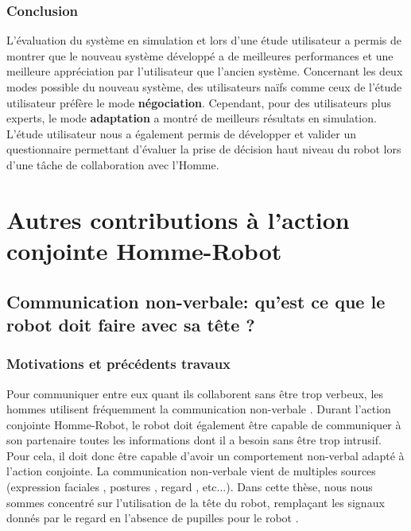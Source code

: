 \documentclass[english,a4paper,11pt,twoside]{StyleThese}
\begin{document}
\subsubsection{Conclusion}

L'évaluation du système en simulation et lors d'une étude utilisateur a permis de montrer que le nouveau système développé a de meilleures performances et une meilleure appréciation par l'utilisateur que l'ancien système. Concernant les deux modes possible du nouveau système, des utilisateurs naïfs comme ceux de l'étude utilisateur préfère le mode \textbf{négociation}. Cependant, pour des utilisateurs plus experts, le mode \textbf{adaptation} a montré de meilleurs résultats en simulation. L'étude utilisateur nous a également permis de développer et valider un questionnaire permettant d'évaluer la prise de décision haut niveau du robot lors d'une tâche de collaboration avec l'Homme. 


\newpage
\section{Autres contributions à l'action conjointe Homme-Robot}

\subsection{Communication non-verbale: qu'est ce que le robot doit faire avec sa tête ?}

\subsubsection{Motivations et précédents travaux}

Pour communiquer entre eux quant ils collaborent sans être trop verbeux, les hommes utilisent fréquemment la communication non-verbale \cite{ekman1969repertoire, depaulo1992nonverbal}. Durant l'action conjointe Homme-Robot, le robot doit également être capable de communiquer à son partenaire toutes les informations dont il a besoin sans être trop intrusif. Pour cela, il doit donc être capable d'avoir un comportement non-verbal adapté à l'action conjointe. La communication non-verbale vient de multiples sources (expression faciales \cite{labarre1947cultural}, postures \cite{mehrabian1969significance}, regard \cite{mutlu2009designing}, etc...). Dans cette thèse, nous nous sommes concentré sur l'utilisation de la tête du robot, remplaçant les signaux donnés par le regard en l'absence de pupilles pour le robot \cite{imai2002robot}.
\end{document}
